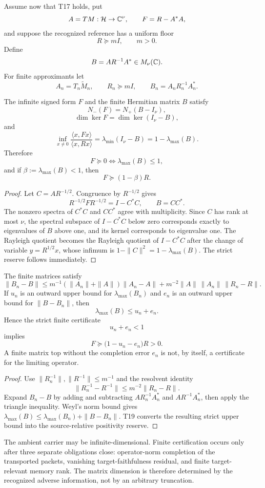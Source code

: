 Assume now that T17 holds, put
\[
A=TM:\mathcal H\to\mathbb C^\nu,
\qquad
F=R-A^*A,
\]
and suppose the recognized reference has a uniform floor
\[
R\succeq mI,
\qquad m>0.
\]
Define
\[
B=AR^{-1}A^*\in M_\nu(\mathbb C).
\]
For finite approximants let
\[
A_n=T_n\widetilde M_n,
\qquad
R_n\succeq mI,
\qquad
B_n=A_nR_n^{-1}A_n^*.
\]

\begin{theorem}
The infinite signed form $F$ and the finite Hermitian matrix $B$ satisfy
\[
N_-(F)=N_+(B-I_\nu),
\]
\[
\dim\ker F=\dim\ker(I_\nu-B),
\]
and
\[
\inf_{x\ne0}
\frac{\langle x,Fx\rangle}{\langle x,Rx\rangle}
=\lambda_{\min}(I_\nu-B)
=1-\lambda_{\max}(B).
\]
Therefore
\[
F\succeq0
\iff
\lambda_{\max}(B)\le1,
\]
and if $\beta:=\lambda_{\max}(B)<1$, then
\[
F\succeq(1-\beta)R.
\]
\end{theorem}

\begin{proof}
Let $C=AR^{-1/2}$. Congruence by $R^{-1/2}$ gives
\[
R^{-1/2}FR^{-1/2}=I-C^*C,
\qquad
B=CC^*.
\]
The nonzero spectra of $C^*C$ and $CC^*$ agree with multiplicity. Since $C$ has rank at most $\nu$, the spectral subspace of $I-C^*C$ below zero corresponds exactly to eigenvalues of $B$ above one, and its kernel corresponds to eigenvalue one. The Rayleigh quotient becomes the Rayleigh quotient of $I-C^*C$ after the change of variable $y=R^{1/2}x$, whose infimum is $1-\|C\|^2=1-\lambda_{\max}(B)$. The strict reserve follows immediately.
\end{proof}

\begin{theorem}
The finite matrices satisfy
\[
\|B_n-B\|
\le
m^{-1}(\|A_n\|+\|A\|)\|A_n-A\|
+m^{-2}\|A\|\,\|A_n\|\,\|R_n-R\|.
\]
If $u_n$ is an outward upper bound for $\lambda_{\max}(B_n)$ and $e_n$ is an outward upper bound for $\|B-B_n\|$, then
\[
\lambda_{\max}(B)\le u_n+e_n.
\]
Hence the strict finite certificate
\[
\boxed{u_n+e_n<1}
\]
implies
\[
F\succeq\bigl(1-u_n-e_n\bigr)R>0.
\]
A finite matrix top without the completion error $e_n$ is not, by itself, a certificate for the limiting operator.
\end{theorem}

\begin{proof}
Use $\|R_n^{-1}\|,\|R^{-1}\|\le m^{-1}$ and the resolvent identity
\[
\|R_n^{-1}-R^{-1}\|
\le m^{-2}\|R_n-R\|.
\]
Expand $B_n-B$ by adding and subtracting $AR_n^{-1}A_n^*$ and $AR^{-1}A_n^*$, then apply the triangle inequality. Weyl's norm bound gives $\lambda_{\max}(B)\le\lambda_{\max}(B_n)+\|B-B_n\|$. T19 converts the resulting strict upper bound into the source-relative positivity reserve.
\end{proof}

\begin{remark}
The ambient carrier may be infinite-dimensional. Finite certification occurs only after three separate obligations close: operator-norm completion of the transported packets, vanishing target-faithfulness residual, and finite target-relevant memory rank. The matrix dimension is therefore determined by the recognized adverse information, not by an arbitrary truncation.
\end{remark}
